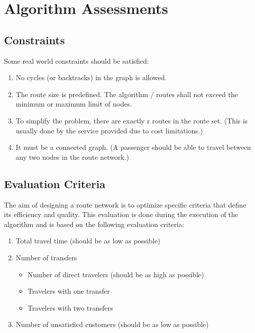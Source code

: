 

\section{Algorithm Assessments}
\subsection{Constraints}
Some real world constraints should be satisfied:
\begin{enumerate}
\item \label{itm:constraintCycles} No cycles (or backtracks) in the graph is allowed.
\item \label{itm:constraintRouteSize} The route size is predefined. The algorithm / routes shall not exceed the minimum or maximum limit of nodes.
\item \label{itm:constraintRouteSet} To simplify the problem, there are exactly r routes in the route set. (This is usually done by the service provided due to cost limitations.)
\item \label{itm:criteriaConnectedGraph} It must be a connected graph. (A passenger should be able to travel between any two nodes in the route network.) 
\end{enumerate}

\subsection{Evaluation Criteria} 
The aim of designing a route network is to optimize specific criteria that define its efficiency and quality. This evaluation is done during the execution of the algorithm and is based on the following evaluation criteria:
\begin{enumerate}
\item \label{itm:criteriaTotalTravelTime} Total travel time (should be as low as possible)
\item \label{itm:f2} Number of transfers
\begin{itemize}
\item Number of direct travelers (should be as high as possible)
\item Travelers with one transfer
\item Travelers with two transfers
\end{itemize}
\item \label{itm:TODO} Number of unsatisfied customers (should be as low as possible)
\end{enumerate}



